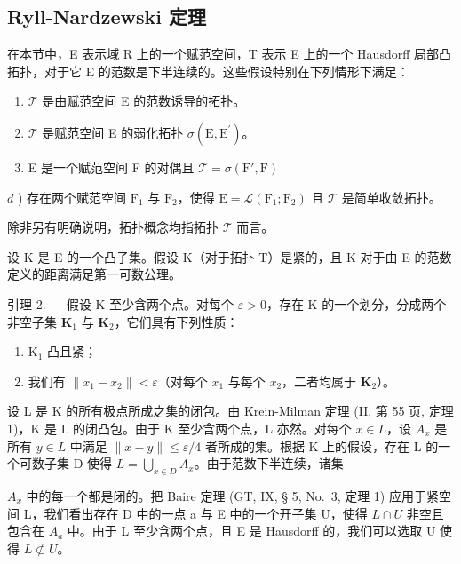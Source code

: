 \subsection{Ryll-Nardzewski 定理}

在本节中，E 表示域 R 上的一个赋范空间，T 表示 E 上的一个 Hausdorff 局部凸拓扑，对于它 E 的范数是下半连续的。这些假设特别在下列情形下满足：

\begin{enumerate}
\def\labelenumi{\alph{enumi})}
\item
  \(\mathcal{T}\) 是由赋范空间 E 的范数诱导的拓扑。
\item
  \(\mathcal{T}\) 是赋范空间 E 的弱化拓扑 \(\sigma (\mathrm{E},\mathrm{E}^{\prime})\)。
\item
  E 是一个赋范空间 F 的对偶且 \(\mathcal{T} = \sigma (\mathrm{F}',\mathrm{F})\)
\end{enumerate}

\(d\) ) 存在两个赋范空间 \(\mathrm{F}_1\) 与 \(\mathrm{F}_2\)，使得 \(\mathrm{E} = \mathcal{L}(\mathrm{F}_1;\mathrm{F}_2)\) 且 \(\mathcal{T}\) 是简单收敛拓扑。

除非另有明确说明，拓扑概念均指拓扑 \(\mathcal{T}\) 而言。

设 K 是 E 的一个凸子集。假设 K（对于拓扑 T）是紧的，且 K 对于由 E 的范数定义的距离满足第一可数公理。

引理 2. --- 假设 K 至少含两个点。对每个 \(\varepsilon > 0\)，存在 K 的一个划分，分成两个非空子集 \(\mathbf{K}_1\) 与 \(\mathbf{K}_2\)，它们具有下列性质：

\begin{enumerate}
\def\labelenumi{\alph{enumi})}
\item
  \(\mathrm{K}_1\) 凸且紧；
\item
  我们有 \(\| x_1 - x_2\| < \varepsilon\)（对每个 \(x_{1}\) 与每个 \(x_{2}\)，二者均属于 \(\mathbf{K}_2\)）。
\end{enumerate}

设 L 是 K 的所有极点所成之集的闭包。由 Krein-Milman 定理 (II, 第 55 页, 定理 1)，K 是 L 的闭凸包。由于 K 至少含两个点，L 亦然。对每个 \(x \in L\)，设 \(A_{x}\) 是所有 \(y \in L\) 中满足 \(\|x - y\| \leqslant \varepsilon/4\) 者所成的集。根据 K 上的假设，存在 L 的一个可数子集 D 使得 \(L = \bigcup_{x \in D} A_{x}\)。由于范数下半连续，诸集

\(A_{x}\) 中的每一个都是闭的。把 Baire 定理 (GT, IX, § 5, No.~3, 定理 1) 应用于紧空间 L，我们看出存在 D 中的一点 a 与 E 中的一个开子集 U，使得 \(L \cap U\) 非空且包含在 \(A_{a}\) 中。由于 L 至少含两个点，且 E 是 Hausdorff 的，我们可以选取 U 使得 \(L \not\subset U\)。

